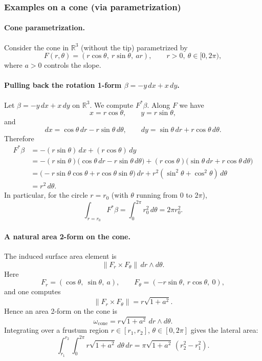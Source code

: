 \documentclass[12pt,a4paper]{article}
\theoremstyle{plain}
\theoremstyle{definition}      %
\begin{document}
\subsubsection*{Examples on a cone (via parametrization)}

\paragraph{Cone parametrization.}
Consider the cone in $\mathbb{R}^3$ (without the tip) parametrized by
\[
F(r,\theta)=(r\cos\theta,\ r\sin\theta,\ a r),
\qquad r>0,\ \theta\in[0,2\pi),
\]
where $a>0$ controls the slope.

\paragraph{Pulling back the rotation 1-form $\beta=-y\,dx+x\,dy$.}
Let $\beta=-y\,dx + x\,dy$ on $\mathbb{R}^3$. We compute $F^*\beta$.
Along $F$ we have
\[
x=r\cos\theta,\qquad y=r\sin\theta,
\]
and
\[
dx=\cos\theta\,dr - r\sin\theta\,d\theta,\qquad
dy=\sin\theta\,dr + r\cos\theta\,d\theta.
\]
Therefore
\begin{align*}
	F^*\beta
	&= -(r\sin\theta)\,dx + (r\cos\theta)\,dy \\
	&= -(r\sin\theta)\big(\cos\theta\,dr - r\sin\theta\,d\theta\big)
	+ (r\cos\theta)\big(\sin\theta\,dr + r\cos\theta\,d\theta\big) \\
	&= \big(-r\sin\theta\cos\theta + r\cos\theta\sin\theta\big)\,dr
	+ r^2(\sin^2\theta+\cos^2\theta)\,d\theta \\
	&= r^2\,d\theta.
\end{align*}
In particular, for the circle $r=r_0$ (with $\theta$ running from $0$ to $2\pi$),
\[
\int_{r=r_0} F^*\beta = \int_0^{2\pi} r_0^2\,d\theta = 2\pi r_0^2.
\]

\paragraph{A natural area 2-form on the cone.}
The induced surface area element is
\[
\|F_r\times F_\theta\|\,dr\wedge d\theta.
\]
Here
\[
F_r=(\cos\theta,\ \sin\theta,\ a),\qquad
F_\theta=(-r\sin\theta,\ r\cos\theta,\ 0),
\]
and one computes
\[
\|F_r\times F_\theta\| = r\sqrt{1+a^2}.
\]
Hence an area 2-form on the cone is
\[
\omega_{\mathrm{cone}} = r\sqrt{1+a^2}\, dr\wedge d\theta.
\]
Integrating over a frustum region $r\in[r_1,r_2]$, $\theta\in[0,2\pi]$ gives the lateral area:
\[
\int_{r_1}^{r_2}\int_0^{2\pi} r\sqrt{1+a^2}\, d\theta\,dr
= \pi\sqrt{1+a^2}\,(r_2^2-r_1^2).
\]
\end{document}
